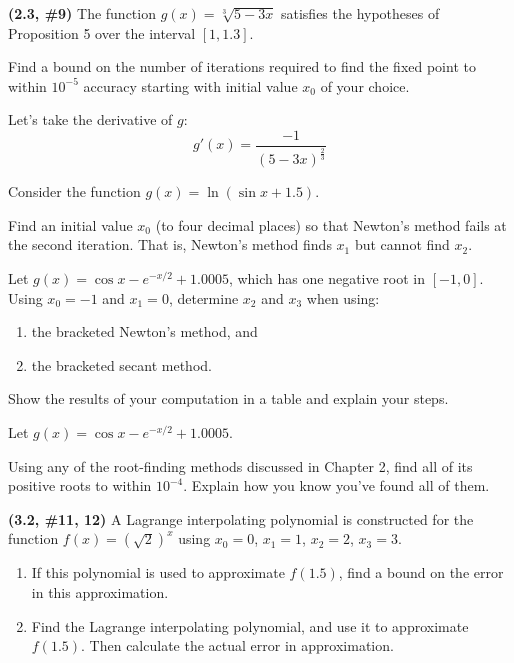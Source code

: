 \documentclass{eh-homework}
\begin{document}
    \newpage
    \begin{question}{2}
    \textbf{(2.3, \#9)} The function \(g(x) = \sqrt[3]{5 - 3x}\) satisfies the hypotheses of Proposition 5 over the interval \([1, 1.3]\).
    
    Find a bound on the number of iterations required to find the fixed point to within \(10^{-5}\) accuracy starting with initial value \(x_0\) of your choice.

    Let's take the derivative of \(g\):
    \[
        g'(x) = \frac{-1}{(5-3x)^{\frac{2}{3}}}
    \]
    \end{question}
    
    \begin{question}{3}
    Consider the function \(g(x) = \ln(\sin x + 1.5)\).
    
    Find an initial value \(x_0\) (to four decimal places) so that Newton’s method fails at the second iteration. That is, Newton’s method finds \(x_1\) but cannot find \(x_2\).
    \end{question}
    
    \begin{question}{4}
    Let \(g(x) = \cos x - e^{-x/2} + 1.0005\), which has one negative root in \([-1, 0]\). Using \(x_0 = -1\) and \(x_1 = 0\), determine \(x_2\) and \(x_3\) when using:
    
    \begin{enumerate}[label=\alph*.]
        \item the bracketed Newton’s method, and
        \item the bracketed secant method.
    \end{enumerate}
    
    Show the results of your computation in a table and explain your steps.
    \end{question}
    
    \begin{question}{5}
    Let \(g(x) = \cos x - e^{-x/2} + 1.0005\).
    
    Using any of the root-finding methods discussed in Chapter 2, find all of its positive roots to within \(10^{-4}\). Explain how you know you’ve found all of them.
    \end{question}
    
    \begin{question}{6}
    \textbf{(3.2, \#11, 12)} A Lagrange interpolating polynomial is constructed for the function \(f(x) = (\sqrt{2})^x\) using \(x_0 = 0\), \(x_1 = 1\), \(x_2 = 2\), \(x_3 = 3\).
    
    \begin{enumerate}[label=\alph*.]
        \item If this polynomial is used to approximate \(f(1.5)\), find a bound on the error in this approximation.
    
        \item Find the Lagrange interpolating polynomial, and use it to approximate \(f(1.5)\). Then calculate the actual error in approximation.
    \end{enumerate}
    \end{question}
\end{document}

